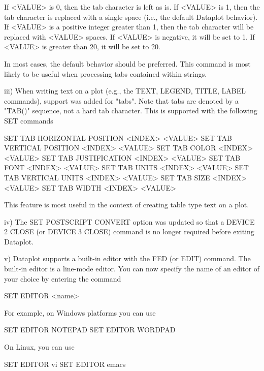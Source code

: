          If <VALUE> is 0, then the tab character is left as is.
         If <VALUE> is 1, then the tab character is replaced with
         a single space (i.e., the default Dataplot behavior).  If
         <VALUE> is a positive integer greater than 1, then the tab
         character will be replaced with <VALUE> spaces.  If <VALUE>
         is negative, it will be set to 1.  If <VALUE> is greater than
         20, it will be set to 20.

         In most cases, the default behavior should be preferred.  This
         command is most likely to be useful when processing tabs
         contained within strings.

    iii) When writing text on a plot (e.g., the TEXT, LEGEND, TITLE,
         LABEL commands), support was added for "tabs".  Note that
         tabs are denoted by a "TAB()" sequence, not a hard tab
         character.  This is supported with the following SET commands

            SET TAB HORIZONTAL POSITION  <INDEX> <VALUE>
            SET TAB VERTICAL   POSITION  <INDEX> <VALUE>
            SET TAB COLOR                <INDEX> <VALUE>
            SET TAB JUSTIFICATION        <INDEX> <VALUE>
            SET TAB FONT                 <INDEX> <VALUE>
            SET TAB UNITS                <INDEX> <VALUE>
            SET TAB VERTICAL UNITS       <INDEX> <VALUE>
            SET TAB SIZE                 <INDEX> <VALUE>
            SET TAB WIDTH                <INDEX> <VALUE>

         This feature is most useful in the context of creating
         table type text on a plot.

     iv) The SET POSTSCRIPT CONVERT option was updated so that a
         DEVICE 2 CLOSE (or DEVICE 3 CLOSE) command is no longer required
         before exiting Dataplot.

      v) Dataplot supports a built-in editor with the FED (or EDIT)
         command.  The built-in editor is a line-mode editor.  You can
         now specify the name of an editor of your choice by entering
         the command

             SET EDITOR <name>

         For example, on Windows platforms you can use

             SET EDITOR NOTEPAD
             SET EDITOR WORDPAD

         On Linux, you can use

             SET EDITOR vi
             SET EDITOR emacs

